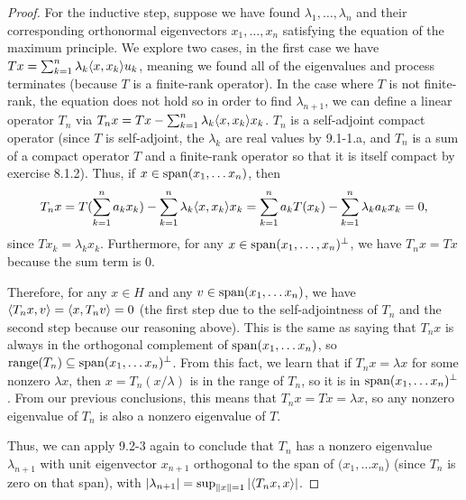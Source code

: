 \begin{proof}
For the inductive step, suppose we have found $\lambda_1, \dots, \lambda_n$ and their corresponding orthonormal eigenvectors $x_1, \dots, x_n$ satisfying the equation of the maximum principle. 
We explore two cases, in the first case we have $Tx = \sum_{k=1}^n \lambda_k \langle x, x_k\rangle u_k$, meaning we found all of the eigenvalues and process terminates (because $T$ is a finite-rank operator).
In the case where $T$ is not finite-rank, the equation does not hold so in order to find $\lambda_{n+1}$, we can define a linear operator $T_n$ via $T_n x = Tx - \sum_{k=1}^n \lambda_k \langle x, x_k\rangle x_k$.
$T_n$ is a self-adjoint compact operator (since $T$ is self-adjoint, the $\lambda_k$ are real values by 9.1-1.a, and $T_n$ is a sum of a compact operator $T$ and a finite-rank operator so that it is itself compact by exercise 8.1.2).
Thus, if $x \in \operatorname*{span}(x_1, \dots x_n)$, then 
\begin{align*}
    T_n x 
    = T(\sum_{k=1}^n a_k x_k) - \sum_{k=1}^n \lambda_k \langle x, x_k\rangle x_k
    = \sum_{k=1}^n a_k T(x_k) - \sum_{k=1}^n \lambda_k a_k x_k
    = 0,
\end{align*}
since $Tx_k = \lambda_k x_k$.
Furthermore, for any $x \in \operatorname*{span}(x_1, \dots, x_n)^\perp$, we have $T_n x = Tx$ because the sum term is 0.

Therefore, for any $x \in H$ and any $v \in \operatorname*{span}(x_1, \dots x_n)$, we have $\langle T_n x, v\rangle = \langle x, T_n v\rangle = 0$ (the first step due to the self-adjointness of $T_n$ and the second step because our reasoning above).
This is the same as saying that $T_n x$ is always in the orthogonal complement of $\operatorname*{span}(x_1, \dots x_n)$, so $\operatorname*{range}(T_n) \subseteq \operatorname*{span}(x_1, \dots x_n)^\perp$.
From this fact, we learn that if $T_n x = \lambda x$ for some nonzero $\lambda x$, then $x = T_n(x / \lambda)$ is in the range of $T_n$, so it is in $\operatorname*{span}(x_1, \dots x_n)^\perp$.
From our previous conclusions, this means that $T_n x = Tx = \lambda x$, so any nonzero eigenvalue of $T_n$ is also a nonzero eigenvalue of $T$.

Thus, we can apply 9.2-3 again to conclude that $T_n$ has a nonzero eigenvalue $\lambda_{n+1}$ with unit eigenvector $x_{n+1}$ orthogonal to the span of $(x_1, \dots x_n$) (since $T_n$ is zero on that span), with $\left\lvert \lambda_{n+1}\right\rvert = \sup_{\left\lVert x\right\rVert=1} \left\lvert \langle T_n x, x\rangle\right\rvert$.


\end{proof}
